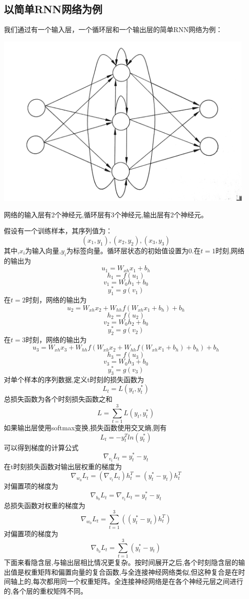 \documentclass{article}
\begin{document}
\subsection{以简单RNN网络为例}
我们通过有一个输入层，一个循环层和一个输出层的简单RNN网络为例：\par 
\centerline{\includegraphics[width=13cm]{mod1}}
网络的输入层有2个神经元,循环层有3个神经元,输出层有2个神经元。\par 
假设有一个训练样本，其序列值为：
$$(x_1,y_1),(x_2,y_2),(x_3,y_3)$$
其中,$x_i$为输入向量,$y_i$为标签向量。循环层状态的初始值设置为0.在$t=1$时刻,网络的输出为
$$u_1=W_{xh}x_1+b_h$$
$$h_1=f(u_1)$$
$$v_1=W_0h_1+b_0$$
$$y_1^*=g(v_1)$$
在$t=2$时刻，网络的输出为
$$u_2=W_{xh}x_2+W_{hh}f(W_{xh}x_1+b_h)+b_h$$
$$h_2=f(u_2)$$
$$v_2=W_0h_2+b_0$$
$$y_2^*=g(v_2)$$
在$t=3$时刻，网络的输出为
$$u_3=W_{xh}x_3+W_{hh}f(W_{xh}x_2+W_{hh}f(W_{xh}x_1+b_h)+b_h)+b_h$$
$$h_3=f(u_3)$$
$$v_3=W_0h_3+b_0$$
$$y_3^*=g(v_3)$$
对单个样本的序列数据,定义t时刻的损失函数为
$$L_t=L(y_t,y_t^*)$$
总损失函数为各个时刻损失函数之和
$$L=\sum_{t=1}^{3}L(y_t,y_t^*)$$
如果输出层使用softmax变换,损失函数使用交叉熵,则有
$$L_t=-y^T_tln(y_t^*)$$
可以得到梯度的计算公式
$$\nabla _{v_t}{L_t}=y_t^*-y_t$$
在t时刻损失函数对输出层权重的梯度为
$$\nabla _{w_0}{L_t}=(\nabla _{v_t}{L_t})h_t^T=(y_t^*-y_t)h_t^T$$
对偏置项的梯度为
$$\nabla _{b_0}{L_t}=\nabla _{v_t}{L_t}=y_t^*-y_t$$
总损失函数对权重的梯度为
$$\nabla _{w_0}{L_t}=\sum_{t=1}^{3}((y_t^*-y_t)h_t^T)$$
对偏置项的梯度为
$$\nabla _{b_0}{L_t}=\sum_{t=1}^{3}(y_t^*-y_t)$$
下面来看隐含层,与输出层相比情况更复杂。按时间展开之后,各个时刻隐含层的输出值是权重矩阵和偏置向量的复合函数,与全连接神经网络类似,但这种复合是在时间轴上的,每次都用同一个权重矩阵。全连接神经网络是在各个神经元层之间进行的,各个层的重权矩阵不同。 
\par
\end{document}
